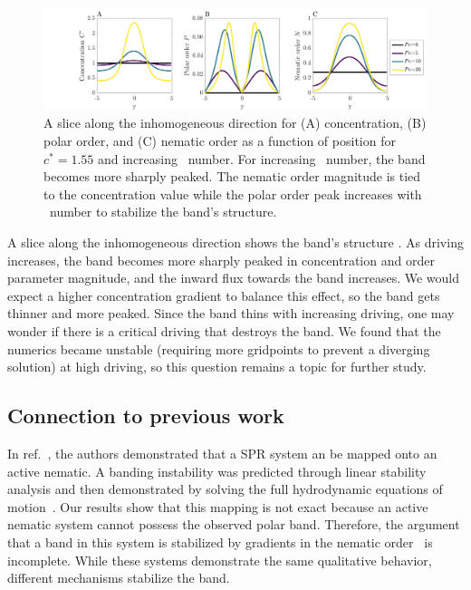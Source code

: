\begin{figure}[!t]
	\centering
  \includegraphics[width=1.00\textwidth]{figs/ch04_active/band_analysis_paper.png}
  \caption[Band structure]
  {A slice along the inhomogeneous direction for (A) concentration, (B) polar
    order, and (C) nematic order as a function of position for $c^* = 1.55$ and
    increasing \peclet~number.  For increasing \peclet~number, the band becomes
    more sharply peaked. The nematic order magnitude is tied to the
    concentration value while the polar order peak increases with \peclet~number
    to stabilize the band's structure.}\label{fig:band_analysis}
\end{figure}

A slice along the inhomogeneous direction shows the band's structure
. As driving increases, the band becomes more sharply
peaked in concentration and order parameter magnitude, and the inward flux
towards the band increases. We would expect a higher concentration gradient to
balance this effect, so the band gets thinner and more peaked. Since
the band thins with increasing driving, one may wonder if there is a
critical driving that destroys the band. We found that the numerics became
unstable (requiring more gridpoints to prevent a diverging solution) at high
driving, so this question remains a topic for further study.

\subsection{Connection to previous work}

In ref.~\cite{baskaran_selfregulation_12}, the authors demonstrated that a SPR
system an be mapped onto an active nematic.  A banding instability was predicted
through linear stability analysis and then demonstrated by solving the full
hydrodynamic equations of motion~\cite{putzig_phase_14}. Our results show that
this mapping is not exact because an active nematic system cannot possess the
observed polar band. Therefore, the argument that a band in this system is
stabilized by gradients in the nematic order~\cite{putzig_phase_14} is
incomplete.  While these systems demonstrate the same qualitative behavior,
different mechanisms stabilize the band.

